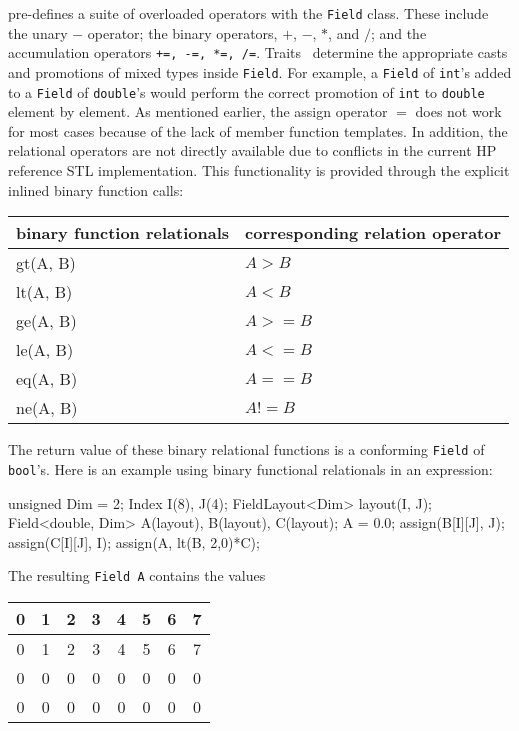 \ippl pre-defines a suite of overloaded operators with the \texttt{Field} class. These include the unary $-$ operator; the binary operators, $+$, $-$, $*$, and $/$; and the accumulation operators \texttt{+=, -=, *=, /=}. Traits~\cite{traits} determine the appropriate casts and promotions of mixed types inside \texttt{Field}. For example, a \texttt{Field} of \texttt{int}'s added to a \texttt{Field} of \texttt{double}'s would perform the correct promotion of \texttt{int} to \texttt{double} element by element. As mentioned earlier, the assign operator $=$ does not work
for most cases because of the lack of member function templates. In addition, the relational operators are not directly available due to conflicts in the current HP reference STL implementation. This functionality is provided through the explicit inlined binary function calls:
%
   \begin{center}
        \begin{tabular}{ll}
        \hline
        binary function relationals & corresponding relation operator \\
        \hline
        gt(A, B) & $A > B$ \\
        lt(A, B) & $A < B$ \\
        ge(A, B) & $A >= B$ \\
        le(A, B) & $A  <= B$ \\
        eq(A, B) & $A == B$ \\
        ne(A, B) & $A != B$ \\
        \hline
        \end{tabular}
   \end{center}
%
The return value of these binary relational functions is a conforming \texttt{Field} of \texttt{bool}'s. Here is an example using binary functional relationals in an expression: \\
\begin{code}
unsigned Dim = 2;
Index I(8), J(4);
FieldLayout<Dim> layout(I, J);
Field<double, Dim> A(layout), B(layout), C(layout);
A = 0.0;
assign(B[I][J], J);
assign(C[I][J], I);
assign(A, lt(B, 2,0)*C);
\end{code}
The resulting \texttt{Field A} contains the values
%
   \begin{center}
        \begin{tabular}{|c|c|c|c|c|c|c|c|}
        \hline
        0 & 1 & 2 & 3 & 4 & 5 & 6 & 7\\        \hline
        0 & 1 & 2 & 3 & 4 & 5 & 6 & 7\\        \hline
        0 & 0 & 0 & 0 & 0 & 0 & 0 & 0\\        \hline
        0 & 0 & 0 & 0 & 0 & 0 & 0 & 0\\        \hline
        \end{tabular}
   \end{center}


